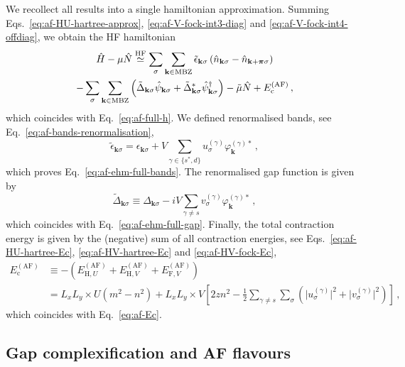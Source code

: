 We recollect all results into a single hamiltonian approximation. Summing Eqs.~\eqref{eq:af-HU-hartree-approx}, \eqref{eq:af-V-fock-int3-diag} and \eqref{eq:af-V-fock-int4-offdiag}, we obtain the HF hamiltonian
\begin{multline}
	\hat H - \mu \hat N \stackrel{\mathrm{HF}}{\simeq} \sum_\sigma \sum_{\mathbf{k}\in\mathrm{MBZ}} \tilde{\epsilon}_{\mathbf{k}\sigma} \left(
	\hat n_{\mathbf{k}\sigma} - \hat n_{\mathbf{k}+\bm{\pi}\sigma}
	\right) \\
	- \sum_\sigma \sum_{\mathbf{k}\in\mathrm{MBZ}} \left(
	\tilde{\Delta}_{\mathbf{k}\sigma}
	\hat \psi_{\mathbf{k}\sigma} + \tilde{\Delta}_{\mathbf{k}\sigma}^* \hat \psi_{\mathbf{k}\sigma}^\dagger
	\right)
	- \tilde{\mu} \hat N + E_\mathrm{c}^{(\mathrm{AF})} \, , \label{appeq:af-full-h}
\end{multline}
which coincides with Eq.~\eqref{eq:af-full-h}. We defined renormalised bands, see Eq.~\eqref{eq:af-bands-renormalisation},
\[
\tilde{\epsilon}_{\mathbf{k}\sigma} = \epsilon_{\mathbf{k}\sigma} + V \sum_{\gamma\in\lbrace s^*,d \rbrace} u^{(\gamma)}_\sigma \varphi_{\mathbf{k}}^{(\gamma)*} \, ,
\]
which proves Eq.~\eqref{eq:af-ehm-full-bands}. The renormalised gap function is given by
\begin{equation}\label{eq:af-full-gap}
	\tilde{\Delta}_{\mathbf{k}\sigma} \equiv \Delta_{\mathbf{k}\sigma} - iV \sum_{\gamma \neq s} v^{(\gamma)}_\sigma \varphi_\mathbf{k}^{(\gamma)*} \, ,
\end{equation}
which coincides with Eq.~\eqref{eq:af-ehm-full-gap}. Finally, the total contraction energy is given by the (negative) sum of all contraction energies, see Eqs.~\eqref{eq:af-HU-hartree-Ec}, \eqref{eq:af-HV-hartree-Ec} and \eqref{eq:af-HV-fock-Ec},
\begin{align}
	E_\mathrm{c}^{(\mathrm{AF})} &\equiv -
	\left( 
	E_{\mathrm{H},U}^{(\mathrm{AF})} + 
	E_{\mathrm{H},V}^{(\mathrm{AF})} + E_{\mathrm{F},V}^{(\mathrm{AF})}
	\right) \nonumber \\
	&= L_x L_y \times U(m^2 - n^2) + L_x L_y \times V \left[
	2zn^2 - \frac{1}{2} \sum_{\gamma \neq s} \sum_\sigma \left(
	\big|u^{(\gamma)}_\sigma\big|^2 + \big|v^{(\gamma)}_\sigma\big|^2
	\right)
	\right]
	\label{appeq:af-Ec}\, ,
\end{align}
which coincides with Eq.~\eqref{eq:af-Ec}.

\subsection{Gap complexification and AF flavours}\label{subsec:af-gap-complexification}

